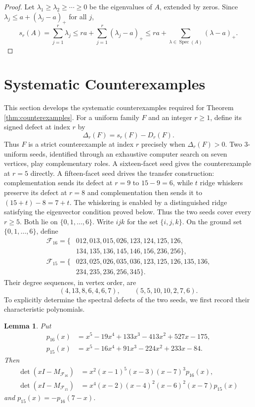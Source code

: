 \documentclass[11pt]{article}
\newtheorem{lemma}[theorem]{Lemma}
\newcommand{\Spec}{\operatorname{Spec}}
\newcommand{\calF}{\mathcal{F}}
\begin{document}
	\begin{proof}
		Let \(\lambda_1\ge\lambda_2\ge\cdots\ge0\) be the eigenvalues of \(A\), extended by zeros. Since \(\lambda_j\le a+(\lambda_j-a)_+\) for all \(j\),
		\[
		s_r(A)
		=
		\sum_{j=1}^r\lambda_j
		\le
		ra+\sum_{j=1}^r(\lambda_j-a)_+
		\le
		ra+\sum_{\lambda\in\Spec(A)}(\lambda-a)_+.
		\]
	\end{proof}
	
\section{Systematic Counterexamples}\label{sec:seeds}
This section develops the systematic counterexamples required for Theorem \ref{thm:counterexamples}.
For a uniform family \(F\) and an integer \(r\ge1\), define its signed
defect at index \(r\) by
\[
\Delta_r(F)=s_r(F)-D_r(F).
\]
Thus \(F\) is a strict counterexample at index \(r\) precisely when
\(\Delta_r(F)>0\).
Two $3$-uniform seeds, identified through an exhaustive computer search on seven vertices,
play complementary roles.
  A sixteen-facet seed
	gives the counterexample at \(r=5\) directly.  A fifteen-facet seed drives
	the transfer construction: complementation sends its defect at \(r=9\) to
	\(15-9=6\), while \(t\) ridge whiskers preserve its defect at \(r=8\) and
	complementation then sends it to \((15+t)-8=7+t\).  The whiskering is
	enabled by a distinguished ridge satisfying the eigenvector condition
	proved below.  Thus the two seeds cover every \(r\ge5\).
	Both lie on \(\{0,1,\ldots,6\}\).
Write \(ijk\) for the set \(\{i,j,k\}\).  On the ground set
	\(\{0,1,\ldots,6\}\), define
	\begin{align*}
		\calF_{16}=\{&012,013,015,026,123,124,125,126,\\
		&134,135,136,145,146,156,236,256\},\\
		\calF_{15}=\{&023,025,026,035,036,123,125,126,135,136,\\
		&234,235,236,256,345\}.
	\end{align*}
	Their degree sequences, in vertex order, are
	\[
	(4,13,8,6,4,6,7),
	\qquad
	(5,5,10,10,2,7,6).
	\]
To explicitly determine the spectral defects of the two seeds, we first record their characteristic polynomials.
\begin{lemma}\label{lem:seed-polynomials}
		Put
		\begin{align*}
			p_{16}(x)&=x^5-19x^4+133x^3-413x^2+527x-175,\\
			p_{15}(x)&=x^5-16x^4+91x^3-224x^2+233x-84.
		\end{align*}
		Then
		\begin{align*}
			\det(xI-M_{\calF_{16}})
			&=x^2(x-1)^5(x-3)(x-7)^3p_{16}(x),\\
			\det(xI-M_{\calF_{15}})
			&=x^4(x-2)(x-4)^2(x-6)^2(x-7)p_{15}(x)
		\end{align*}
		and \(p_{15}(x)=-p_{16}(7-x)\).
	\end{lemma}
	
\end{document}

